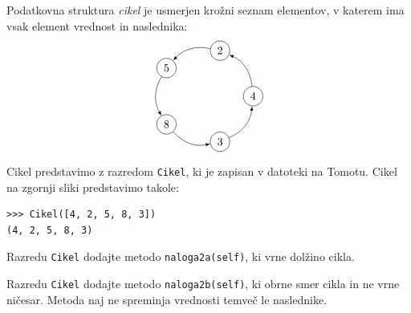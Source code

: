 \documentclass[arhiv]{izpit}
\begin{document}
Podatkovna struktura \emph{cikel} je usmerjen krožni seznam elementov, v katerem ima vsak element vrednost in naslednika:
%
\[
\begin{tikzpicture}
    \node (a) [circle, draw, minimum size=0.5cm] at (0 : 1.5) {4};
    \node (b) [circle, draw, minimum size=0.5cm] at (72 : 1.5) {2};
    \node (c) [circle, draw, minimum size=0.5cm] at (144 : 1.5) {5};
    \node (d) [circle, draw, minimum size=0.5cm] at (216 : 1.5) {8};
    \node (e) [circle, draw, minimum size=0.5cm] at (288 : 1.5) {3};
    \draw[bend right, >=latex, ->] (a) to (b);
    \draw[bend right, >=latex, ->] (b) to (c);
    \draw[bend right, >=latex, ->] (c) to (d);
    \draw[bend right, >=latex, ->] (d) to (e);
    \draw[bend right, >=latex, ->] (e) to (a);
\end{tikzpicture}
\]
%
Cikel predstavimo z razredom \texttt{Cikel}, ki je zapisan v datoteki na Tomotu.
%
%    
%  
%
Cikel na zgornji sliki predstavimo takole:
%
\begin{verbatim}
>>> Cikel([4, 2, 5, 8, 3])
(4, 2, 5, 8, 3)
\end{verbatim}

\podnaloga[20 točk]
Razredu \texttt{Cikel} dodajte metodo \texttt{naloga2a(self)}, ki vrne dolžino cikla.

\podnaloga[20 točk]
Razredu \texttt{Cikel} dodajte metodo \texttt{naloga2b(self)}, ki obrne smer cikla in ne vrne
ničesar. Metoda naj ne spreminja vrednosti temveč le naslednike.


\end{document}
